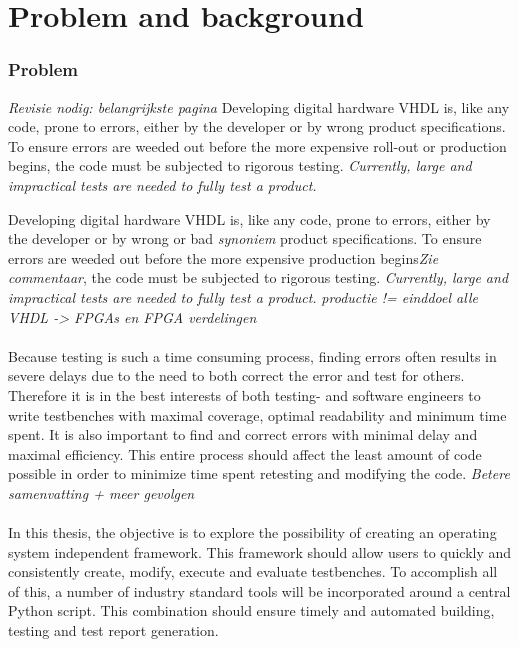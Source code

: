 \documentclass[11pt,british]{article}
\begin{document}
\printglossary[type=\acronymtype,title={List of Acronyms}]
\pagebreak

\part{Problem and background}
\renewcommand{\thepage}{\arabic{page}}
\setcounter{page}{1}


\section{Problem}
\emph{\color{red}Revisie nodig: belangrijkste pagina}
Developing digital hardware \gls{VHDL} is, like any code, prone to errors, either by the developer or by wrong product specifications. To ensure errors are weeded out before the more expensive roll-out or production begins, the code must be subjected to rigorous testing. \emph{Currently, large and impractical tests are needed to fully test a product.}

Developing digital hardware \gls{VHDL} is, like any code, prone to errors, either by the developer or by wrong or bad \emph{\color{red}synoniem} product specifications. To ensure errors are weeded out before the more expensive production begins\emph{\color{red}Zie commentaar}, the code must be subjected to rigorous testing. \emph{Currently, large and impractical tests are needed to fully test a product.}
\emph{\color{red}productie != einddoel alle VHDL -> FPGAs en FPGA verdelingen}
\\
\\
Because testing is such a time consuming process, finding errors often results in severe delays due to the need to both correct the error and test for others. Therefore it is in the best interests of both testing- and software engineers to write testbenches with maximal coverage, optimal readability and minimum time spent. It is also important to find and correct errors with minimal delay and maximal efficiency. This entire process should affect the least amount of code possible in order to minimize time spent retesting and modifying the code.
\emph{\color{red} Betere samenvatting + meer gevolgen}
\\
\\
In this thesis, the objective is to explore the possibility of creating an operating system independent framework. This framework should allow users to quickly and consistently create, modify, execute and evaluate testbenches. To accomplish all of this, a number of industry standard tools will be incorporated around a central Python script. This combination should ensure timely and automated building, testing and test report generation.
\end{document}
